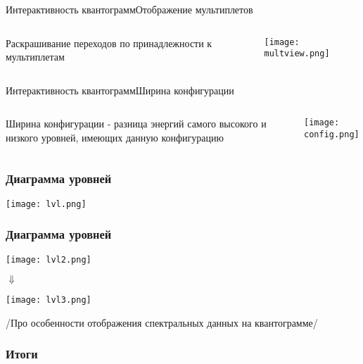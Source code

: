 \documentclass{beamer}
\begin{document}
\begin{frame}{Интерактивность квантограмм}{Отображение мультиплетов}
\begin{columns}
    \begin{column}{0.4\textwidth}
        Раскрашивание переходов по принадлежности к мультиплетам
    \end{column}
    \begin{column}{0.6\textwidth}
    \texttt{[image: multview.png]}
    \end{column}
  \end{columns}
\end{frame}

\begin{frame}{Интерактивность квантограмм}{Ширина конфигурации}
\begin{columns}
    \begin{column}{0.4\textwidth}
        Ширина конфигурации - разница энергий самого высокого и низкого уровней, имеющих данную конфигурацию
    \end{column}
    \begin{column}{0.6\textwidth}
    \texttt{[image: config.png]}
    \end{column}
  \end{columns}
\end{frame}

\begin{frame}
\frametitle{Диаграмма уровней}
    \texttt{[image: lvl.png]}
\end{frame}

\begin{frame}
\frametitle{Диаграмма уровней}
    \texttt{[image: lvl2.png]}\\\begin{center} {$\Downarrow$} \end{center}
    \texttt{[image: lvl3.png]}
\end{frame}

\begin{frame}
    /Про особенности отображения спектральных данных на квантограмме/
\end{frame}

\begin{frame}
\frametitle{Итоги }
  
\end{frame}
\end{document}
